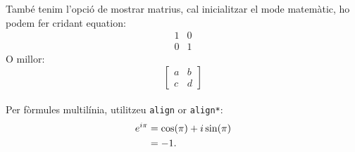 També tenim l'opció de mostrar matrius, cal inicialitzar el mode matemàtic, ho podem fer cridant equation:
\begin{equation*}
	\begin{matrix}
		1 & 0\\
		0 & 1
	\end{matrix}
\end{equation*}
O millor:
    \[\begin{bmatrix}
        a & b \\
        c & d
    \end{bmatrix}\] 
\\
%
Per fòrmules multilínia, utilitzeu \verb|align| or \verb|align*|:
%
\begin{align}
e^{i\pi} & = \cos(\pi) + i\sin(\pi) \notag \\
         & = -1 .
\end{align}

